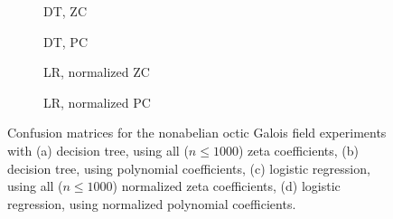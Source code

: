 \documentclass[letterpaper, 10pt]{article}
\newcommand{\1}{\mathds{1}}	%
\theoremstyle{definition}
\theoremstyle{remark}
\begin{document}
\begin{figure}[h]
    \centering
    \begin{subfigure}[t]{0.23\textwidth}
        \centering
        \caption{DT, ZC}
        \label{fig:octic_nab_dt_zc}
    \end{subfigure}
    \hfill
    \begin{subfigure}[t]{0.23\textwidth}
        \centering
        \caption{DT, PC}
        \label{fig:octic_nab_dt_pc}
    \end{subfigure}
    \hfill
    \begin{subfigure}[t]{0.23\textwidth}
        \centering
        \caption{LR, normalized ZC}
        \label{fig:octic_nab_lr_zc_normalized}
    \end{subfigure}
    \hfill
    \begin{subfigure}[t]{0.23\textwidth}
        \centering
        \caption{LR, normalized PC}
        \label{fig:octic_nab_lr_pc_normalized}
    \end{subfigure}
    \caption{Confusion matrices for the nonabelian octic Galois field experiments with (a) decision tree, using all ($n \le 1000$) zeta coefficients, (b) decision tree, using polynomial coefficients, (c) logistic regression, using all ($n \le 1000$) normalized zeta coefficients, (d) logistic regression, using normalized polynomial coefficients.}
    \label{fig:galois_8_nab_cm}
\end{figure}
\end{document}

